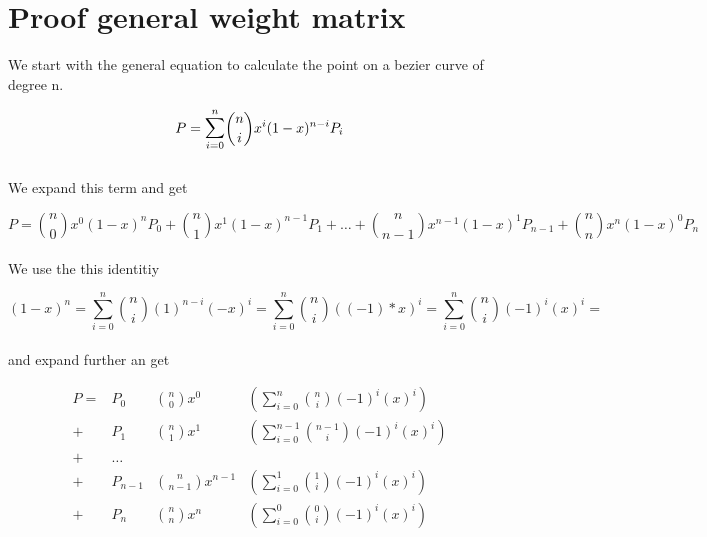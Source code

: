 \section{Proof general weight matrix}

We start with the general equation to calculate the point on a bezier curve of degree n.

\begin{equation*}
    P=\mathlarger{\sum}_{i = 0}^{n} {n \choose i}x^i (1-x)^{n-i} P_i
\end{equation*}
\\ We expand this term and get

\begin{equation*}
    P=
    {n \choose 0}x^0 (1-x)^{n} P_0 +
    {n \choose 1}x^1 (1-x)^{n - 1} P_1 +
    \dots +
    {n \choose n-1}x^{n-1} (1-x)^{1} P_{n-1} +
    {n \choose n}x^{n} (1-x)^{0} P_{n}
\end{equation*}
\\
We use the this identitiy

\begin{equation*}
    (1-x)^n =
    \sum_{i = 0}^{n} {n \choose i} (1)^{n-i}(-x)^{i} =
    \sum_{i = 0}^{n} {n \choose i} ((-1)*x)^{i} =
    \sum_{i = 0}^{n} {n \choose i} (-1)^{i}(x)^{i} =
\end{equation*}
\\
and expand further an get

\begin{align*}
    P= & P_0     & {n \choose 0}x^0       & ( \sum_{i = 0}^{n}   {n \choose i}    (-1)^{i}  (x)^{i}) \\
    +  & P_1     & {n \choose 1}x^1       & ( \sum_{i = 0}^{n-1} {n-1 \choose i}  (-1)^{i}  (x)^{i}) \\
    +  & \dots                                                                                       \\
    +  & P_{n-1} & {n \choose n-1}x^{n-1} & ( \sum_{i = 0}^{1}   {1 \choose i}    (-1)^{i}  (x)^{i}) \\
    +  & P_n     & {n \choose n}x^n       & ( \sum_{i = 0}^{0}   {0 \choose i}    (-1)^{i}  (x)^{i}) \\
\end{align*}

